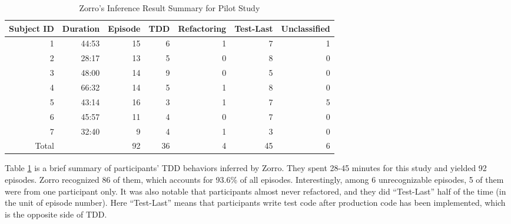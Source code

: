 \begin{table}[!h]
\centering
  \begin{tabular}{|r|r|r|r|r|r|r|}
  \hline
    Subject ID & Duration & Episode & TDD & Refactoring & Test-Last & Unclassified \\ \hline
    1 & 44:53 & 15 &  6 &  1 &  7 & 1 \\ \hline
    2 & 28:17 & 13 &  5 &  0 &  8 & 0 \\ \hline
    3 & 48:00 & 14 &  9 &  0 &  5 & 0 \\ \hline
    4 & 66:32 & 14 &  5 &  1 &  8 & 0 \\ \hline
    5 & 43:14 & 16 &  3 &  1 &  7 & 5 \\ \hline
    6 & 45:57 & 11 &  4 &  0 &  7 & 0 \\ \hline
    7 & 32:40 &  9 &  4 &  1 &  3 & 0 \\ \hline \hline
    Total &   & 92 & 36 &  4 & 45 & 6 \\ 
  \hline
  \end{tabular}
  \caption{Zorro's Inference Result Summary for Pilot Study}\label{tab:ZorroPilotStudy}  
\end{table}
Table \ref{tab:ZorroPilotStudy} is a brief summary of participants'
TDD behaviors inferred by Zorro. They spent 28-45 minutes for this
study and yielded 92 episodes. Zorro recognized 86 of them, which
accounts for 93.6\% of all episodes. Interestingly, among 6
unrecognizable episodes, 5 of them were from one participant only. It
was also notable that participants almost never refactored, and they
did ``Test-Last'' half of the time (in the unit of episode number).
Here ``Test-Last'' means that participants write test code after
production code has been implemented, which is the opposite side of
TDD.

